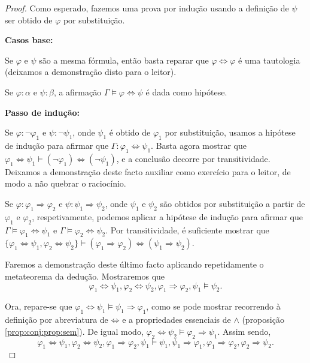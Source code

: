 \documentclass{report}
\theoremstyle{definition}
\theoremstyle{remark}
\newcommand{\imply}{\mathbin{\Rightarrow}}
\newcommand{\eqv}{\mathbin{\Leftrightarrow}}
\begin{document}
	\begin{proof}
	Como esperado, fazemos uma prova por indução usando a definição de $\psi$ ser obtido de $\varphi$ por substituição.
	
	\smallskip
	\textbf{Casos base:}
	
	Se $\varphi$ e $\psi$ são a mesma fórmula, então basta reparar que $\varphi \eqv \varphi$ é uma tautologia (deixamos a demonstração disto para o leitor).
	
	Se $\varphi : \alpha$ e $\psi : \beta$, a afirmação $\Gamma \vDash \varphi \eqv \psi$ é dada como hipótese.
	
	\smallskip
	\textbf{Passo de indução:}
	
	Se $\varphi : \neg \varphi_1$ e $\psi : \neg \psi_1$, onde $\psi_1$ é obtido de $\varphi_1$ por substituição, usamos a hipótese de indução para afirmar que $\Gamma : \varphi_1 \eqv \psi_1$. Basta agora mostrar que $\varphi_1 \eqv \psi_1 \vDash (\neg \varphi_1) \eqv (\neg \psi_1)$, e a conclusão decorre por transitividade. Deixamos a demonstração deste facto auxiliar como exercício para o leitor, de modo a não quebrar o raciocínio.
	
	Se $\varphi : \varphi_1 \imply \varphi_2$ e $\psi : \psi_1 \imply \psi_2$, onde $\psi_1$ e $\psi_2$ são obtidos por substituição a partir de $\varphi_1$ e $\varphi_2$, respetivamente, podemos aplicar a hipótese de indução para afirmar que $\Gamma \vDash \varphi_1 \eqv \psi_1$ e $\Gamma \vDash \varphi_2 \eqv \psi_2$. Por transitividade, é suficiente mostrar que $\{\varphi_1 \eqv \psi_1, \varphi_2 \eqv \psi_2\} \vDash (\varphi_1 \imply \varphi_2) \eqv (\psi_1 \imply \psi_2)$.
	
	Faremos a demonstração deste último facto aplicando repetidamente o metateorema da dedução. Mostraremos que
	\begin{equation}\label{eq:mse:1}
	\varphi_1 \eqv \psi_1, \varphi_2 \eqv \psi_2, \varphi_1 \imply \varphi_2, \psi_1 \vDash \psi_2.
	\end{equation}
	
	Ora, repare-se que $\varphi_1 \eqv \psi_1 \vDash \psi_1 \imply \varphi_1$, como se pode mostrar recorrendo à definição por abreviatura de $\eqv$ e a propriedades essenciais de $\land$ (proposição \ref{prop:conj:prop:sem}). De igual modo, $\varphi_2 \eqv \psi_2 \vDash \varphi_2 \imply \psi_1$. Assim sendo,
	\[\varphi_1 \eqv \psi_1, \varphi_2 \eqv \psi_2, \varphi_1 \imply \varphi_2, \psi_1 \vDash \psi_1, \psi_1 \imply \varphi_1, \varphi_1 \imply \varphi_2, \varphi_2 \imply \psi_2.\]
	

\end{proof}
\end{document}
